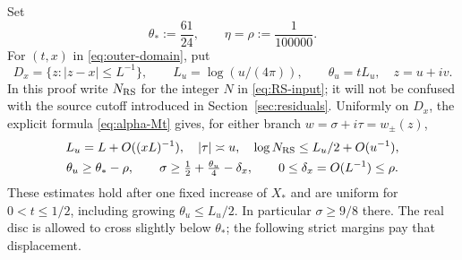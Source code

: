 \documentclass[11pt]{article}
\numberwithin{equation}{section}
\theoremstyle{definition}
\theoremstyle{remark}
\begin{document}
Set
\[
 \theta_*:=\frac{61}{24},\qquad \eta=\rho:=\frac1{100000}.
\]
For $(t,x)$ in \eqref{eq:outer-domain}, put
\begin{equation}
 D_x=\{z:|z-x|\le L^{-1}\},\qquad
 L_u=\log(u/(4\pi)),\qquad \theta_u=tL_u,
 \quad z=u+iv.
 \label{eq:shrinking-disc}
\end{equation}
In this proof write $N_{\rm RS}$ for the integer $N$ in
\eqref{eq:RS-input}; it will not be confused with the source cutoff
introduced in Section~\ref{sec:residuals}. Uniformly on $D_x$, the
explicit formula \eqref{eq:alpha-Mt} gives, for either branch
$w=\sigma+i\tau=w_\pm(z)$,
\begin{equation}
 \begin{gathered}
 L_u=L+O((xL)^{-1}),\quad |\tau|\asymp u,\quad
 \log N_{\rm RS}\le L_u/2+O(u^{-1}),\\
 \theta_u\ge\theta_*-\rho,\qquad
 \sigma\ge\tfrac12+\tfrac{\theta_u}{4}-\delta_x,\qquad
 0\le\delta_x=O(L^{-1})\le\rho.
 \end{gathered}
 \label{eq:exponent-bounds}
\end{equation}
These estimates hold after one fixed increase of $X_*$ and are uniform
for $0<t\le1/2$, including growing $\theta_u\le L_u/2$. In particular
$\sigma\ge9/8$ there. The real disc is allowed to cross slightly below
$\theta_*$; the following strict margins pay that displacement.
\end{document}
